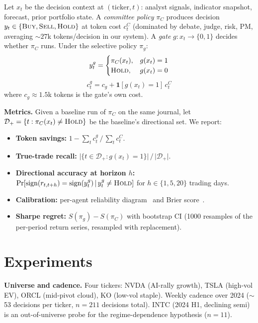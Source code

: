 \documentclass[conference]{IEEEtran}
\begin{document}
Let $x_t$ be the decision context at $(\text{ticker}, t)$: analyst
signals, indicator snapshot, forecast, prior portfolio state. A
\emph{committee policy} $\pi_C$ produces decision $y_t \in
\{\textsc{Buy}, \textsc{Sell}, \textsc{Hold}\}$ at token cost $c_t^C$
(dominated by debate, judge, risk, PM, averaging $\sim27$k
tokens/decision in our system). A \emph{gate}
$g:x_t \to \{0,1\}$ decides whether $\pi_C$ runs. Under the selective
policy $\pi_g$:
\begin{equation}
  y_t^g =
  \begin{cases}
    \pi_C(x_t), & g(x_t) = 1 \\
    \textsc{Hold}, & g(x_t) = 0
  \end{cases}
\end{equation}
\begin{equation}
  c_t^g = c_g + \mathbf{1}[g(x_t){=}1]\, c_t^C
\end{equation}
where $c_g \approx 1.5$k tokens is the gate's own cost.

\textbf{Metrics.}
Given a baseline run of $\pi_C$ on the same journal, let
$\mathcal{D}_+ = \{t : \pi_C(x_t) \ne \textsc{Hold}\}$ be the
baseline's directional set. We report:
\begin{itemize}\itemsep1pt
  \item \textbf{Token savings:}
    $1 - \sum_t c_t^g \,/\, \sum_t c_t^C$.
  \item \textbf{True-trade recall:}
    $\lvert\{t \in \mathcal{D}_+ : g(x_t){=}1\}\rvert
     \,/\, \lvert\mathcal{D}_+\rvert$.
  \item \textbf{Directional accuracy at horizon $h$:}
    $\Pr[\mathrm{sign}(r_{t,t+h}) = \mathrm{sign}(y_t^g)
     \,|\, y_t^g \ne \textsc{Hold}]$
    for $h \in \{1,5,20\}$ trading days.
  \item \textbf{Calibration:} per-agent reliability
    diagram~\cite{niculescu2005predicting} and Brier
    score~\cite{brier1950}.
  \item \textbf{Sharpe regret:}
    $S(\pi_g) - S(\pi_C)$ with bootstrap CI (1000 resamples of the
    per-period return series, resampled with replacement).
\end{itemize}

\section{Experiments}

\textbf{Universe and cadence.}
Four tickers: NVDA (AI-rally growth), TSLA (high-vol EV), ORCL
(mid-pivot cloud), KO (low-vol staple). Weekly cadence over 2024
($\sim$53 decisions per ticker, $n{=}211$ decisions total). INTC
(2024 H1, declining semi) is an out-of-universe probe for the
regime-dependence hypothesis ($n{=}11$).
\end{document}
